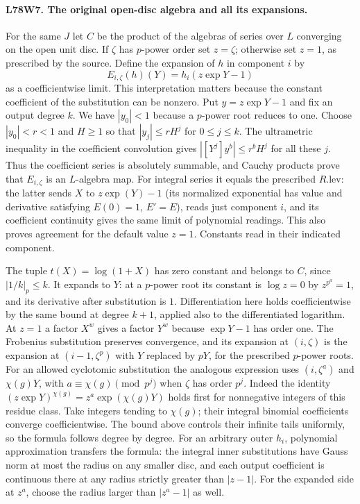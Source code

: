 \paragraph{L78W7. The original open-disc algebra and all its expansions.}
For the same $J$ let $C$ be the product of the algebras of series over
$L$ converging on the open unit disc. If $\zeta$ has $p$-power order
set $z=\zeta$; otherwise set $z=1$, as prescribed by the source.
Define the expansion of $h$ in component $i$ by
\[
       E_{i,\zeta}(h)(Y)=h_i(z\exp Y-1)
\]
as a coefficientwise limit. This interpretation matters because the
constant coefficient of the substitution can be nonzero. Put
$y=z\exp Y-1$ and fix an output degree $k$. We have $|y_0|<1$
because a $p$-power root reduces to one. Choose
$|y_0|<r<1$ and $H\ge1$ so that $|y_j|\le rH^j$ for
$0\le j\le k$. The ultrametric inequality in the coefficient
convolution gives $|[Y^j]y^b|\le r^bH^j$ for all these $j$.
Thus the coefficient series is absolutely summable, and Cauchy
products prove that $E_{i,\zeta}$ is an $L$-algebra map.
For integral series it equals the prescribed $R.\mathrm{lev}$:
the latter sends $X$ to $z\exp(Y)-1$ (its normalized exponential
has value and derivative satisfying $E(0)=1$, $E'=E$), reads just
component $i$, and its coefficient continuity gives the same
limit of polynomial readings. This also proves agreement for the
default value $z=1$. Constants read in their indicated component.

The tuple $t(X)=\log(1+X)$ has zero constant and belongs to $C$,
since $|1/k|_p\le k$. It expands to $Y$: at a $p$-power root its
constant is $\log z=0$ by $z^{p^a}=1$, and its derivative after
substitution is $1$. Differentiation here holds coefficientwise by
the same bound at degree $k+1$, applied also to the differentiated
logarithm. At $z=1$ a factor $X^w$ gives a factor $Y^w$ because
$\exp Y-1$ has order one. The Frobenius substitution preserves
convergence, and its expansion at $(i,\zeta)$ is the expansion at
$(i-1,\zeta^p)$ with $Y$ replaced by $pY$, for the prescribed
$p$-power roots. For an allowed cyclotomic substitution the
analogous expression uses $(i,\zeta^a)$ and $\chi(g)Y$, with
$a\equiv\chi(g)\pmod{p^j}$ when $\zeta$ has order $p^j$.
Indeed the identity
$(z\exp Y)^{\chi(g)}=z^a\exp(\chi(g)Y)$ holds first for
nonnegative integers of this residue class. Take integers tending
to $\chi(g)$; their integral binomial coefficients converge
coefficientwise. The bound above controls their infinite tails
uniformly, so the formula follows degree by degree. For an
arbitrary outer $h_i$, polynomial approximation transfers the
formula: the integral inner substitutions have Gauss norm at most
the radius on any smaller disc, and each output coefficient is
continuous there at any radius strictly greater than $|z-1|$.
For the expanded side at $z^a$, choose the radius larger than
$|z^a-1|$ as well.

